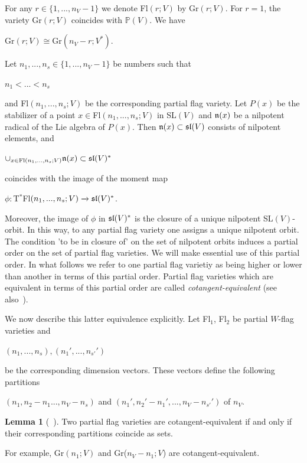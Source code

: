\documentclass[12pt]{amsart}
\theoremstyle{definition}\newtheorem{theorem}{Theorem}[section]
\newtheorem{lemma}[proposition]{Lemma}
\theoremstyle{definition}\newtheorem{definition}[proposition]{Definition}
\theoremstyle{remark}\newtheorem{example}[proposition]{Example}
\renewcommand{\to}[1][]{\xrightarrow{#1}}
\begin{document}
For any $r\in\{1, ..., n_V-1\}$ we denote Fl$(r; V)$ by Gr$(r; V)$.
For $r=1$, the variety Gr$(r; V)$ coincides with $\mathbb P(V)$. We
have\begin{center}Gr$(r; V)\cong$Gr$(n_V-r; V^*)$.\end{center} Let
$n_1, ..., n_s\in\{1, ..., n_V-1\}$ be numbers such that
\begin{center}$n_1<...< n_s$\end{center} and Fl$(n_1, ..., n_s; V)$
be the corresponding partial flag variety. Let $P(x)$ be the
stabilizer of a point $x\in$Fl$(n_1, ..., n_s; V)$ in SL$(V)$ and
$\frak n(x)$ be a nilpotent radical of the Lie algebra of $P(x)$.
Then $\frak n(x)\subset\frak{sl}(V)$ consists of nilpotent elements,
and \begin{center}$\cup_{x\in\mathrm{Fl}(n_1, ..., n_s; V)}\frak
n(x)\subset\frak{sl}(V)^*$\end{center} coincides with the image of
the moment map \begin{center}$\phi:$T$^*$Fl$(n_1,..., n_s;
V)\to\frak{sl}(V)^*$.\end{center}Moreover, the image of $\phi$ in
$\frak{sl}(V)^*$ is the closure of a unique nilpotent SL$(V)$-orbit.
In this way, to any partial flag variety one assigns a unique
nilpotent orbit. The condition 'to be in closure of' on the set of
nilpotent orbits induces a partial order on the set of partial flag
varieties. We will make essential use of this partial order. In what
follows we refer to one partial flag varietiy as being higher or
lower than another in terms of this partial order. Partial flag
varieties which are equivalent in terms of this partial order are
called {\it cotangent-equivalent} (see also~\cite{Kn3}).

We now describe this latter equivalence explicitly. Let Fl$_1$,
Fl$_2$ be partial $W$-flag varieties and \begin{center}$(n_1,...,
n_s), (n_1',..., n_{s'}')$\end{center} be the corresponding
dimension vectors. These vectors define the following
partitions\begin{center}$(n_1, n_2-n_1..., n_V-n_s)$ and $(n_1',
n_2'-n_1',..., n_V-n_{s'}')$ of $n_V$.\end{center}
\begin{lemma}[{~\cite[Ch.~6.2]{CM}}]\label{TtoP} Two partial flag varieties are cotangent-equivalent if and only if their corresponding partitions coincide as sets.\end{lemma}
For example, Gr$(n_1; V)$ and Gr($n_V-n_1; V$) are cotangent-equivalent.
\end{document}
